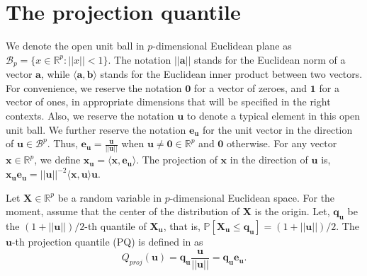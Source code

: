 \documentclass[twoside]{article}
\newcommand{\mbfeu}{\mathbf{e}_{\mathbf u} }
\begin{document}
 
\section{The projection quantile} 
\label{sec:PQ}

We denote the  open unit ball in $p$-dimensional Euclidean plane as 
$\mathcal{B}_{p} = \{ x  \in \mathbb{R}^{p}: || x || < 1 \}$. The notation 
$|| \mathbf{a} ||$ stands for the Euclidean norm of a vector $\mathbf{a}$, while 
$\langle \mathbf{a}, \mathbf{b} \rangle$ 
stands for the Euclidean inner product between two vectors.
For convenience, we reserve the notation 
$\mathbf{0}$ for a vector of zeroes, and $\mathbf{1}$ for a vector of ones, in appropriate 
dimensions that will be specified in the right contexts. 
Also, we reserve the notation $\mathbf{u}$ to 
denote a typical element in this open unit ball. 
We further reserve the notation $\mathbf{e}_{\mathbf u}$ 
for the unit vector in the direction of 
$\mathbf{u} \in \mathcal{B}^p$. Thus,  $\mathbf{e}_{\mathbf u}  = 
\frac{\mathbf{u}}{||\mathbf{u}||}$ when 
$\mathbf{u} \ne \mathbf{0} \in \mathbb{R}^{p}$ and 
$\mathbf{0}$ otherwise.
For any vector $\mathbf{x} \in \mathbb{R}^{p}$, we define 
$\mathbf{x}_\mathbf{u} = \langle \mathbf{x}, \mbfeu \rangle$.
The projection of $\mathbf{x}$ in the direction of $\mathbf{u}$ is,
$\mathbf{x}_\mathbf{u} \mbfeu 
= ||\mathbf{u}||^{-2} \langle \mathbf{x}, \mathbf{u} \rangle \mathbf{u}$. 


Let $\mathbf{X} \in \mathbb{R}^p$ be a random variable in $p$-dimensional Euclidean 
space. 
For the moment, assume that the center of the distribution of $\mathbf{X}$ 
is the origin. 
Let, $\mathbf{q}_\mathbf{u}$ be the $ (1 + || \mathbf{u} ||)/2$-th quantile of 
$\mathbf{X}_\mathbf{u}$, that is, 
$\mathbb{P} [ \mathbf{X}_\mathbf{u} \leq \mathbf{q}_\mathbf{u} ] = 
(1 + || \mathbf{u} || )/2$. The $\mathbf{u}$-th projection quantile (PQ) is defined 
in \cite{MukhopadhyayC11} as
\begin{equation}
Q_{proj} (\mathbf{u}) = \mathbf{q}_\mathbf{u} \frac{\mathbf{u}}{||\mathbf{u}||} 
= \mathbf{q}_\mathbf{u} \mbfeu.
\end{equation}

\end{document}
